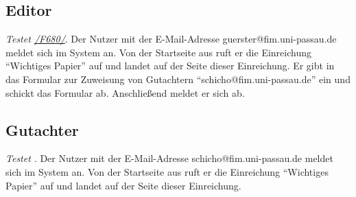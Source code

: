 \subsection{Editor}
\begin{description}

	 \emph{Testet \hyperref[funkt:680]{/F680/}}.
	Der Nutzer mit der E-Mail-Adresse guerster@fim.uni-passau.de meldet sich im System an.
	Von der Startseite aus ruft er die Einreichung ``Wichtiges Papier'' auf und landet auf der Seite dieser Einreichung.
	Er gibt in das Formular zur Zuweisung von Gutachtern ``schicho@fim.uni-passau.de'' ein und schickt das Formular ab.
	Anschließend meldet er sich ab.



\end{description}

\subsection{Gutachter}
\begin{description}

	 \emph{Testet \hyperref[]{}}.
	Der Nutzer mit der E-Mail-Adresse schicho@fim.uni-passau.de meldet sich im System an.
	Von der Startseite aus ruft er die Einreichung ``Wichtiges Papier'' auf und landet auf der Seite dieser Einreichung.
	

\end{description}

